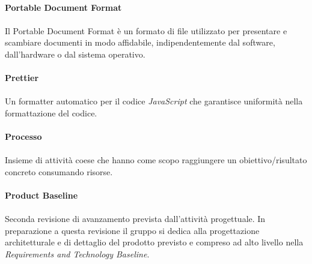 \documentclass[10pt, a4paper]{article}
\begin{document}
\vspace{2em}
\paragraph{Portable Document Format}\noindent\hrulefill
\paragraph{}Il Portable Document Format è un formato di file utilizzato per presentare e scambiare documenti in modo affidabile, indipendentemente dal software, dall'hardware o dal sistema operativo.

\vspace{2em}
\paragraph{Prettier}\noindent\hrulefill
\paragraph{}Un formatter automatico per il codice \textit{JavaScript\pg} che garantisce uniformità nella formattazione del codice.


\vspace{2em}
\paragraph{Processo}\noindent\hrulefill
\paragraph{}Insieme di attività coese che hanno come scopo raggiungere un obiettivo/risultato concreto consumando risorse.

\vspace{2em}
\paragraph{Product Baseline}\noindent\hrulefill
\paragraph{}Seconda revisione di avanzamento prevista dall’attività progettuale. In preparazione a questa revisione il gruppo si dedica alla progettazione architetturale e di dettaglio del prodotto previsto e compreso ad alto livello nella \textit{Requirements and Technology Baseline\pg}.

\vspace{2em}
\end{document}
